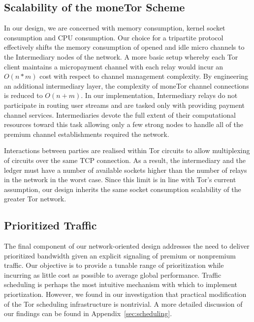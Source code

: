 \subsection{Scalability of the moneTor Scheme}
\label{subsub:scalability}

In our design, we are concerned with memory consumption, kernel socket
consumption and CPU consumption. Our choice for a tripartite protocol
effectively shifts the memory consumption of opened and idle micro channels to
the Intermediary nodes of the network. A more basic setup whereby each Tor
client maintains a micropayment channel with each relay would incur an $O(n*m)$
cost with respect to channel management complexity. By engineering an additional
intermediary layer, the complexity of moneTor channel connections is reduced to
$O(n+m)$. In our implementation, Intermediary relays do not participate in
routing user streams and are tasked only with providing payment channel
services. Intermediaries devote the full extent of their computational resources
toward this task allowing only a few strong nodes to handle all of the premium
channel establishments required the network.

Interactions between parties are realised within Tor circuits to allow
multiplexing of circuits over the same TCP connection. As a result, the
intermediary and the ledger must have a number of available sockets higher than
the number of relays in the network in the worst case. Since this limit is in
line with Tor's current assumption, our design inherits the same socket
consumption scalability of the greater Tor network.

\subsection{Prioritized Traffic}
\label{subsub:prioritized}

The final component of our network-oriented design addresses the need to deliver
prioritized bandwidth given an explicit signaling of premium or nonpremium
traffic. Our objective is to provide a tunable range of prioritization while
incurring as little cost as possible to average global performance. Traffic
scheduling is perhaps the most intuitive mechanism with which to implement
priortization. However, we found in our investigation that practical
modification of the Tor scheduling infrastructure is nontrivial. A more detailed
discussion of our findings can be found in Appendix~\ref{sec:scheduling}.

